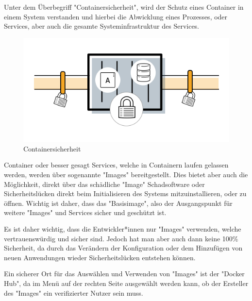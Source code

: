 
Unter dem Überbegriff "Containersicherheit", wird der Schutz eines Container in einem System verstanden und hierbei die Abwicklung eines Prozesses, oder Services, aber auch die gesamte Systeminfrastruktur des Services. \cite{ContainerSecurity}

\begin{figure}[H]
    \centering
    \includegraphics[width=\textwidth]{media/DockerAndContainering/Containersicherheit.png}
    \caption{Containersicherheit \cite{ContainerSecurity}}
\end{figure}


Container oder besser gesagt Services, welche in Containern laufen gelassen werden, werden über sogenannte "Images" bereitgestellt. Dies bietet aber auch die Möglichkeit, direkt über das schädliche "Image" Schadsoftware oder Sicherheitslücken direkt beim Initialisieren des Systems mitzuinstallieren, oder zu öffnen. Wichtig ist daher, dass das "Basisimage", also der Ausgangspunkt für weitere "Images" und Services sicher und geschützt ist. \cite{ContainerSecurity}

Es ist daher wichtig, dass die Entwickler*innen nur "Images" verwenden, welche vertrauenswürdig und sicher sind. Jedoch hat man aber auch dann keine 100\% Sicherheit, da durch das Verändern der Konfiguration oder dem Hinzufügen von neuen Anwendungen wieder Sicherheitslücken entstehen können. \cite{ContainerSecurity}

Ein sicherer Ort für das Auswählen und Verwenden von "Images" ist der "Docker Hub", da im Menü auf der rechten Seite ausgewählt werden kann, ob der Ersteller des "Images" ein verifizierter Nutzer sein muss. \cite{ContainerSecurity}

